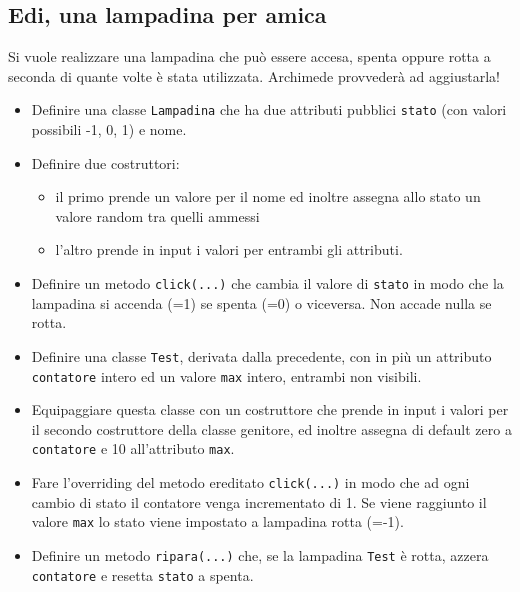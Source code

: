 \documentclass{article}
\begin{document}
\subsection{Edi, una lampadina per amica}
Si vuole realizzare una lampadina che può essere accesa, spenta oppure rotta a seconda di quante volte è stata utilizzata. Archimede provveder\`{a} ad aggiustarla!

\begin{itemize}

\item Definire una classe \texttt{Lampadina} che ha due attributi pubblici \texttt{stato} (con valori possibili -1, 0, 1) e nome. 

\item Definire due costruttori: 
	\begin{itemize}
	\item il primo prende un valore per il nome ed inoltre assegna allo  stato un valore random tra quelli ammessi
	\item l’altro prende in input i valori per entrambi gli attributi.
	\end{itemize}

\item Definire un metodo \texttt{click(...)} che cambia il valore di \texttt{stato} in modo che la lampadina si accenda (=1) se spenta (=0) o viceversa. Non accade nulla se rotta.

\item Definire una classe \texttt{Test}, derivata dalla precedente, con in pi\`u un attributo \texttt{contatore} intero ed un valore \texttt{max} intero, entrambi non visibili.

\item Equipaggiare questa classe con un costruttore che prende in input i valori per il secondo costruttore della classe genitore, ed inoltre assegna di default zero a \texttt{contatore} e 10 all'attributo \texttt{max}.

\item Fare l'overriding del metodo ereditato \texttt{click(...)} in modo che ad ogni cambio di stato il contatore venga incrementato di 1. Se viene raggiunto il valore \texttt{max} lo stato viene impostato a lampadina rotta (=-1).

\item Definire un metodo \texttt{ripara(...)} che, se la lampadina \texttt{Test} \`e rotta, azzera \texttt{contatore} e resetta \texttt{stato} a spenta.

\end{itemize}
\end{document}
